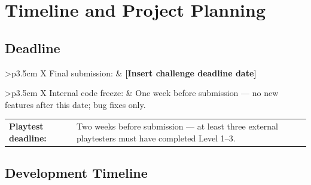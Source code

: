 \documentclass[12pt,a4paper]{article}
\newcommand{\gddfield}[2]{%
  \noindent\begin{tabularx}{\linewidth}{>{\bfseries\color{accent}\sffamily}p{3.5cm} X}
    #1 & #2
  \end{tabularx}\smallskip}
\begin{document}
\section{Timeline and Project Planning}

\subsection{Deadline}

\begin{tcolorbox}[redbox, title={Submission Deadline}]
\gddfield{Final submission:}{\textbf{[Insert challenge deadline date]}}
\gddfield{Internal code freeze:}{One week before submission — no new features after this date; bug fixes only.}
\gddfield{Playtest deadline:}{Two weeks before submission — at least three external playtesters must have completed Level 1--3.}
\end{tcolorbox}

\subsection{Development Timeline}
\end{document}
